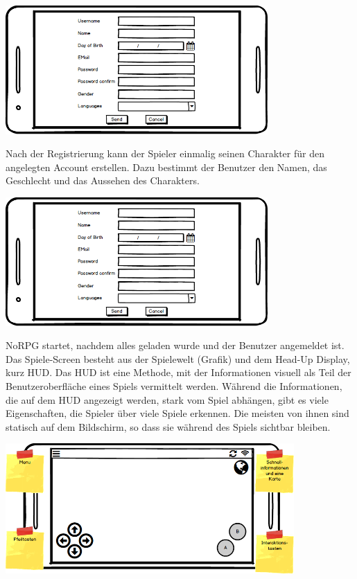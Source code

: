 			\begin{center}
				\includegraphics[width=10cm]{pics/Register_Mockup.png}
			\end{center}
			
			Nach der Registrierung kann der Spieler einmalig seinen Charakter für den angelegten Account erstellen. Dazu bestimmt der Benutzer den Namen, das Geschlecht und das Aussehen des Charakters.
			
			\begin{center}
				\includegraphics[width=10cm]{pics/Register_Mockup.png}
			\end{center}
			
			NoRPG startet, nachdem alles geladen wurde und der Benutzer angemeldet ist. Das Spiele-Screen besteht aus der Spielewelt (Grafik) und dem Head-Up Display, kurz HUD. Das HUD ist eine Methode, mit der Informationen visuell als Teil der Benutzeroberfläche eines Spiels vermittelt werden. Während die Informationen, die auf dem HUD angezeigt werden, stark vom Spiel abhängen, gibt es viele Eigenschaften, die Spieler über viele Spiele erkennen. Die meisten von ihnen sind statisch auf dem Bildschirm, so dass sie während des Spiels sichtbar bleiben. 
			
			\begin{center}
				\includegraphics[width=11cm]{pics/HUD_Mockup.png}
			\end{center}
			
